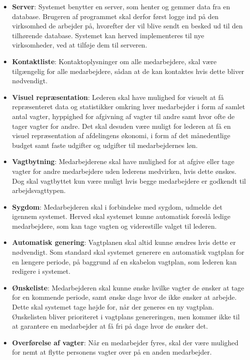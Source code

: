 \begin{itemize}
    \item \textbf{Server}: Systemet benytter en server, som henter og gemmer data fra en database. Brugeren af programmet skal derfor først logge ind på den virksomhed de arbejder på, hvorefter der vil blive sendt en besked ud til den tilhørende database. Systemet kan herved implementeres til nye virksomheder, ved at tilføje dem til serveren.
    \item \textbf{Kontaktliste}: Kontaktoplysninger om alle medarbejdere, skal være tilgængelig for alle medarbejdere, sådan at de kan kontaktes hvis dette bliver nødvendigt.
    \item \textbf{Visuel repræsentation}: Lederen skal have mulighed for visuelt at få repræsenteret data og statistikker omkring hver medarbejder i form af samlet antal vagter, hyppighed for afgivning af vagter til andre samt hvor ofte de tager vagter for andre. Det skal desuden være muligt for lederen at få en visuel repræsentation af afdelingens økonomi, i form af det månedentlige budget samt faste udgifter og udgifter til medarbejdernes løn. 
    \item \textbf{Vagtbytning}: Medarbejderene skal have mulighed for at afgive eller tage vagter for andre medarbejdere uden lederens medvirken, hvis dette ønskes. Dog skal vagtbyttet kun være muligt hvis begge medarbejdere er godkendt til arbejdsvagttypen.
    \item \textbf{Sygdom}: Medarbejderen skal i forbindelse med sygdom, udmelde det igennem systemet. Herved skal systemet kunne automatisk foreslå ledige medarbejdere, som kan tage vagten og viderestille valget til lederen.
    \item \textbf{Automatisk genering}: Vagtplanen skal altid kunne ændres hvis dette er nødvendigt. Som standard skal systemet generere en automatisk vagtplan for en længere periode, på baggrund af en skabelon vagtplan, som lederen kan redigere i systemet.
    \item \textbf{Ønskeliste}: Medarbejderen skal kunne ønske hvilke vagter de ønsker at tage for en kommende periode, samt ønske dage hvor de ikke ønsker at arbejde. Dette skal systemet tage højde for, når der generes en ny vagtplan. Ønskelisten bliver prioriteret i vagtplans genereringen, men kommer ikke til at garantere en medarbejder at få fri på dage hvor de ønsker det.
    \item \textbf{Overførelse af vagter}: Når en medarbejder fyres, skal der være mulighed for nemt at flytte personens vagter over på en anden medarbejder.

\end{itemize}
